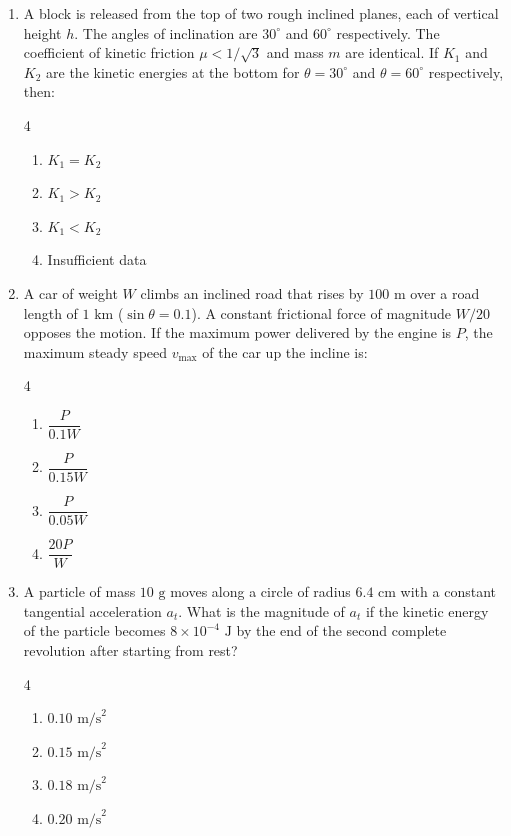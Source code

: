 \documentclass[11pt,a4paper]{article}
\begin{document}
\begin{enumerate}[label=\textbf{\arabic*.},leftmargin=18pt,itemsep=8pt,resume]
  \item A block is released from the top of two rough inclined planes, each of vertical height $h$. The angles of inclination are $30^\circ$ and $60^\circ$ respectively. The coefficient of kinetic friction $\mu < 1/\sqrt{3}$ and mass $m$ are identical. If $K_1$ and $K_2$ are the kinetic energies at the bottom for $\theta = 30^\circ$ and $\theta = 60^\circ$ respectively, then:
  \begin{multicols}{4}
    \begin{enumerate}[label=(\Alph*)]
      \item $K_1 = K_2$
      \item $K_1 > K_2$
      \item $K_1 < K_2$
      \item Insufficient data
    \end{enumerate}
  \end{multicols}

  \item A car of weight $W$ climbs an inclined road that rises by $100\text{ m}$ over a road length of $1\text{ km}$ ($\sin\theta = 0.1$). A constant frictional force of magnitude $W/20$ opposes the motion. If the maximum power delivered by the engine is $P$, the maximum steady speed $v_{\max}$ of the car up the incline is:
  \begin{multicols}{4}
    \begin{enumerate}[label=(\Alph*)]
      \item $\dfrac{P}{0.1 W}$
      \item $\dfrac{P}{0.15 W}$
      \item $\dfrac{P}{0.05 W}$
      \item $\dfrac{20 P}{W}$
    \end{enumerate}
  \end{multicols}

  \item A particle of mass $10\text{ g}$ moves along a circle of radius $6.4\text{ cm}$ with a constant tangential acceleration $a_t$. What is the magnitude of $a_t$ if the kinetic energy of the particle becomes $8 \times 10^{-4}\text{ J}$ by the end of the second complete revolution after starting from rest?
  \begin{multicols}{4}
    \begin{enumerate}[label=(\Alph*)]
      \item $0.10\text{ m/s}^2$
      \item $0.15\text{ m/s}^2$
      \item $0.18\text{ m/s}^2$
      \item $0.20\text{ m/s}^2$
    \end{enumerate}
  \end{multicols}


\end{enumerate}
\end{document}
